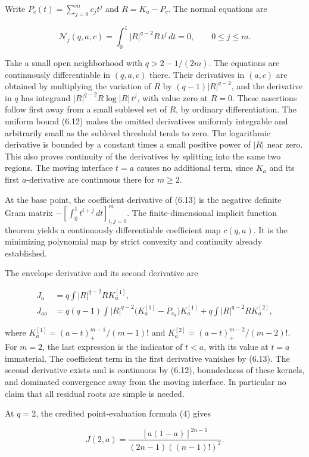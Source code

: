 \documentclass[11pt]{article}
\begin{document}
Write \(P_c(t)=\sum_{j=0}^mc_jt^j\) and \(R=K_a-P_c\). The normal
equations are

\[
\mathcal N_j(q,a,c)=\int_0^1|R|^{q-2}R\,t^j\,dt=0,
\qquad 0\le j\le m.
\tag{6.13}
\]

Take a small open neighborhood with \(q>2-1/(2m)\). The equations are
continuously differentiable in \((q,a,c)\) there. Their derivatives in
\((a,c)\) are obtained by multiplying the variation of \(R\) by
\((q-1)|R|^{q-2}\), and the derivative in \(q\) has integrand
\(|R|^{q-2}R\log|R|\,t^j\), with value zero at \(R=0\). These assertions
follow first away from a small sublevel set of \(R\), by ordinary
differentiation. The uniform bound (6.12) makes the omitted derivatives
uniformly integrable and arbitrarily small as the sublevel threshold
tends to zero. The logarithmic derivative is bounded by a constant times
a small positive power of \(|R|\) near zero. This also proves continuity
of the derivatives by splitting into the same two regions. The moving
interface \(t=a\) causes no additional term, since \(K_a\) and its first
\(a\)-derivative are continuous there for \(m\ge2\).

At the base point, the coefficient derivative of (6.13) is the negative
definite Gram matrix \(-[\int_0^1t^{i+j}\,dt]_{i,j=0}^m\). The
finite-dimensional implicit function theorem yields a continuously
differentiable coefficient map \(c(q,a)\). It is the minimizing
polynomial map by strict convexity and continuity already established.

The envelope derivative and its second derivative are

\[
\begin{aligned}
J_a&=q\int |R|^{q-2}R K_a^{[1]},\\
J_{aa}&=q(q-1)\int |R|^{q-2}
\bigl(K_a^{[1]}-P_{c_a}\bigr)K_a^{[1]}
+q\int |R|^{q-2}R K_a^{[2]},
\end{aligned}
\tag{6.14}
\]

where \(K_a^{[1]}=(a-t)_+^{m-1}/(m-1)!\) and
\(K_a^{[2]}=(a-t)_+^{m-2}/(m-2)!\). For \(m=2\), the last expression is
the indicator of \(t<a\), with its value at \(t=a\) immaterial. The
coefficient term in the first derivative vanishes by (6.13). The second
derivative exists and is continuous by (6.12), boundedness of these
kernels, and dominated convergence away from the moving interface. In
particular no claim that all residual roots are simple is needed.

At \(q=2\), the credited point-evaluation formula (4) gives

\[
J(2,a)=\frac{[a(1-a)]^{2n-1}}{(2n-1)((n-1)!)^2}.
\tag{6.15}
\]
\end{document}
